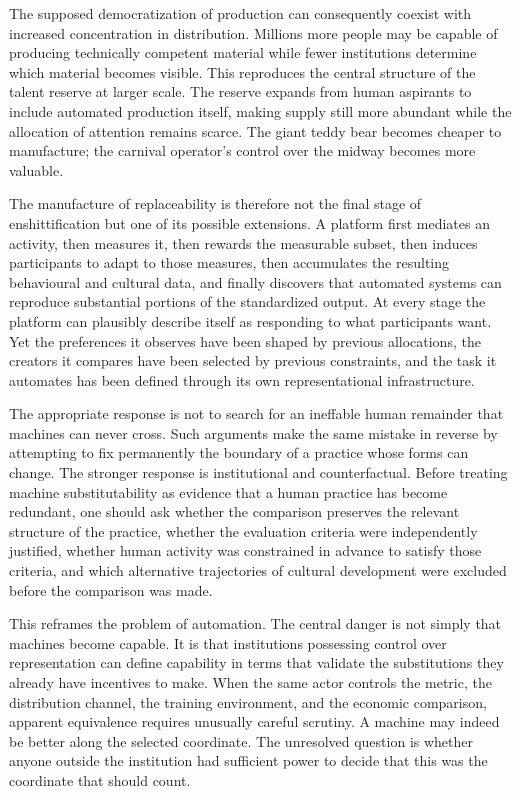 \documentclass[11pt]{article}
\begin{document}
The supposed democratization of production can consequently coexist with increased concentration in distribution. Millions more people may be capable of producing technically competent material while fewer institutions determine which material becomes visible. This reproduces the central structure of the talent reserve at larger scale. The reserve expands from human aspirants to include automated production itself, making supply still more abundant while the allocation of attention remains scarce. The giant teddy bear becomes cheaper to manufacture; the carnival operator's control over the midway becomes more valuable.

The manufacture of replaceability is therefore not the final stage of enshittification but one of its possible extensions. A platform first mediates an activity, then measures it, then rewards the measurable subset, then induces participants to adapt to those measures, then accumulates the resulting behavioural and cultural data, and finally discovers that automated systems can reproduce substantial portions of the standardized output. At every stage the platform can plausibly describe itself as responding to what participants want. Yet the preferences it observes have been shaped by previous allocations, the creators it compares have been selected by previous constraints, and the task it automates has been defined through its own representational infrastructure.

The appropriate response is not to search for an ineffable human remainder that machines can never cross. Such arguments make the same mistake in reverse by attempting to fix permanently the boundary of a practice whose forms can change. The stronger response is institutional and counterfactual. Before treating machine substitutability as evidence that a human practice has become redundant, one should ask whether the comparison preserves the relevant structure of the practice, whether the evaluation criteria were independently justified, whether human activity was constrained in advance to satisfy those criteria, and which alternative trajectories of cultural development were excluded before the comparison was made.

This reframes the problem of automation. The central danger is not simply that machines become capable. It is that institutions possessing control over representation can define capability in terms that validate the substitutions they already have incentives to make. When the same actor controls the metric, the distribution channel, the training environment, and the economic comparison, apparent equivalence requires unusually careful scrutiny. A machine may indeed be better along the selected coordinate. The unresolved question is whether anyone outside the institution had sufficient power to decide that this was the coordinate that should count.
\end{document}
